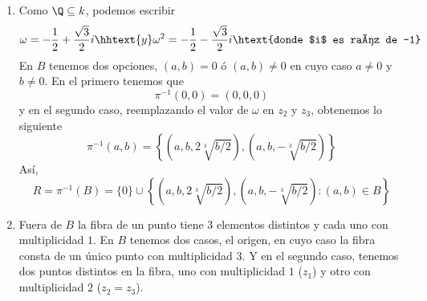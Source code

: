 \documentclass{article}
\begin{document}
\begin{enumerate}
    \item[(b)] Como $\Q\subseteq k$, podemos escribir
    \begin{equation*}
        \omega=-\frac{1}{2}+\frac{\sqrt{3}}{2}i \hhtext{y} 
        \omega^{2}=-\frac{1}{2}-\frac{\sqrt{3}}{2}i \htext{donde $i$ es raíz de -1}
    \end{equation*}
    En $B$ tenemos dos opciones, $(a,b)=0$ ó $(a,b)\neq0$ en cuyo caso $a\neq0$ y $b\neq0$. En el
    primero tenemos que
    \begin{equation*}
        \pi^{-1}(0,0)=(0,0,0)
    \end{equation*}
    y en el segundo caso, reemplazando el valor de $\omega$ en $z_{2}$ y $z_{3}$, obtenemos lo 
    siguiente
    \begin{equation*}
        \pi^{-1}(a,b)=\left\{
            \left(a,b,2\sqrt[3]{b/2}\right),\left(a,b,-\sqrt[3]{b/2}\right)
        \right\}
    \end{equation*}
    Así,
    \begin{equation*}
        R=\pi^{-1}(B)=\{0\}\cup\left\{
            \left(a,b,2\sqrt[3]{b/2}\right),\left(a,b,-\sqrt[3]{b/2}\right):(a,b)\in B
        \right\}
    \end{equation*}
    
    \item[(d)] Fuera de $B$ la fibra de un punto tiene $3$ elementos distintos y cada uno con 
    multiplicidad $1$. En $B$ tenemos dos casos, el origen, en cuyo caso la fibra consta de un 
    único punto con multiplicidad $3$. Y en el segundo caso, tenemos dos puntos distintos en la 
    fibra, uno con multiplicidad $1$ ($z_{1}$) y otro con multiplicidad $2$ ($z_{2}=z_{3}$).
    
\end{enumerate}
\end{document}
